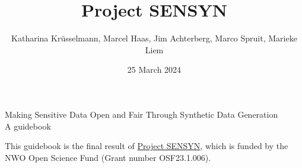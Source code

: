 \documentclass[12pt, twoside]{book}
\title{Project SENSYN}
\author{Katharina Krüsselmann, Marcel Haas, Jim Achterberg, Marco Spruit, Marieke Liem}
\date{25 March 2024}
\begin{document}
\pagestyle{plain}
\raggedbottom

\begin{titlepage}
    \thispagestyle{empty}
    \centering
    \vspace*{\fill}
    \Huge{Making Sensitive Data Open and Fair Through Synthetic Data Generation}\\
    \vspace{0.5cm}
    \Large{A guidebook}\\
   
    \vspace*{\fill}
    
    
    \vspace*{\fill}
\end{titlepage}

\newpage
\thispagestyle{empty} %

This guidebook is the final result of \href{https://www.nwo.nl/en/projects/osf231006}{Project SENSYN}, which is funded by the NWO Open Science Fund (Grant number OSF23.1.006). \\
\end{document}
